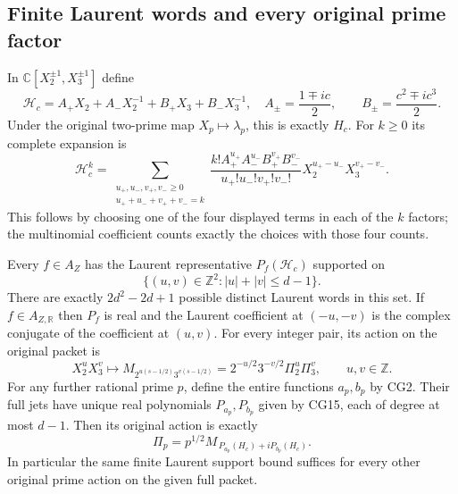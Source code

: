 \subsection{Finite Laurent words and every original prime factor}

In $\mathbb{C}[X_2^{\pm1},X_3^{\pm1}]$ define
\begin{equation}
 \mathcal H_c=A_+X_2+A_-X_2^{-1}+B_+X_3+B_-X_3^{-1},
 \quad A_\pm=\frac{1\mp ic}{2},\qquad
 B_\pm=\frac{c^2\mp ic^3}{2}.
 \tag{CG19}\label{cg:laurent-h}
\end{equation}
Under the original two-prime map $X_p\mapsto\lambda_p$, this is
exactly $H_c$. For $k\ge0$ its complete expansion is
\begin{equation}
 \mathcal H_c^k=
 \sum_{\substack{u_+,u_-,v_+,v_-\ge0\\u_++u_-+v_++v_-=k}}
 \frac{k! A_+^{u_+}A_-^{u_-}B_+^{v_+}B_-^{v_-}}
      {u_+!u_-!v_+!v_-!}
 X_2^{u_+-u_-}X_3^{v_+-v_-}.
 \tag{CG20}\label{cg:multinomial}
\end{equation}
This follows by choosing one of the four displayed terms in
each of the $k$ factors; the multinomial coefficient counts
exactly the choices with those four counts.

\begin{proposition}
\label{cg:words-thm}
Every $f\in A_Z$ has the Laurent representative
$P_f(\mathcal H_c)$ supported on
\begin{equation}
 \{(u,v)\in\mathbb{Z}^2:|u|+|v|\le d-1\}.
 \tag{CG21}\label{cg:diamond}
\end{equation}
There are exactly $2d^2-2d+1$ possible distinct Laurent words
in this set. If $f\in A_{Z,\mathbb{R}}$ then $P_f$ is real and the
Laurent coefficient at $(-u,-v)$ is the complex conjugate of
the coefficient at $(u,v)$.
For every integer pair, its action on the original packet is
\begin{equation}
 X_2^uX_3^v\longmapsto
 M_{2^{u(s-1/2)}3^{v(s-1/2)}}
 =2^{-u/2}3^{-v/2}\Pi_2^u\Pi_3^v,
 \qquad u,v\in\mathbb{Z}.
 \tag{CG22}\label{cg:original-words}
\end{equation}
For any further rational prime $p$, define the entire functions
$a_p,b_p$ by CG2. Their full jets have unique real polynomials
$P_{a_p},P_{b_p}$ given by CG15, each of degree at most $d-1$.
Then its original action is exactly
\begin{equation}
 \Pi_p=p^{1/2}M_{\,P_{a_p}(H_c)+iP_{b_p}(H_c)}.
 \tag{CG23}\label{cg:all-primes}
\end{equation}
In particular the same finite Laurent support bound suffices
for every other original prime action on the given full packet.
\end{proposition}

